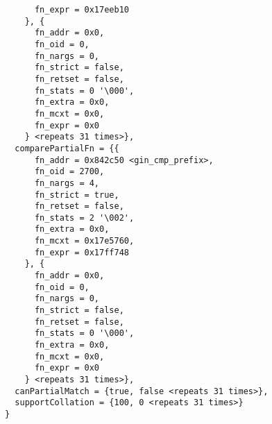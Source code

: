\documentclass[
]{article}
\begin{document}
\begin{itemize}
\begin{verbatim}
      fn_expr = 0x17eeb10
    }, {
      fn_addr = 0x0,
      fn_oid = 0,
      fn_nargs = 0,
      fn_strict = false,
      fn_retset = false,
      fn_stats = 0 '\000',
      fn_extra = 0x0,
      fn_mcxt = 0x0,
      fn_expr = 0x0
    } <repeats 31 times>},
  comparePartialFn = {{
      fn_addr = 0x842c50 <gin_cmp_prefix>,
      fn_oid = 2700,
      fn_nargs = 4,
      fn_strict = true,
      fn_retset = false,
      fn_stats = 2 '\002',
      fn_extra = 0x0,
      fn_mcxt = 0x17e5760,
      fn_expr = 0x17ff748
    }, {
      fn_addr = 0x0,
      fn_oid = 0,
      fn_nargs = 0,
      fn_strict = false,
      fn_retset = false,
      fn_stats = 0 '\000',
      fn_extra = 0x0,
      fn_mcxt = 0x0,
      fn_expr = 0x0
    } <repeats 31 times>},
  canPartialMatch = {true, false <repeats 31 times>},
  supportCollation = {100, 0 <repeats 31 times>}
}
\end{verbatim}
\end{itemize}
\end{document}
